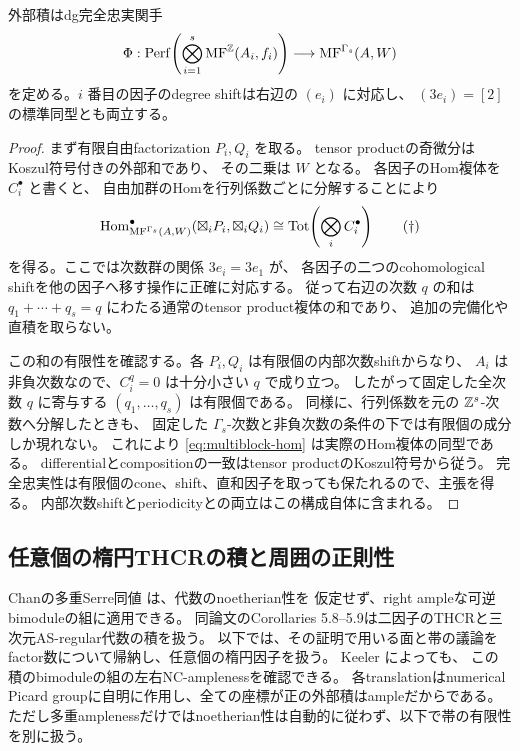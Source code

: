 \begin{lemma}[外部積の完全忠実性]\label{lem:multiblock-ff}
 外部積はdg完全忠実関手
 \[
 \Phi:\operatorname{Perf}\!\left(\bigotimes_{i=1}^s\operatorname{MF}^{\mathbb Z}(A_i,f_i)\right)
 \longrightarrow\operatorname{MF}^{\Gamma_s}(A,W)
 \]
 を定める。\(i\) 番目の因子のdegree shiftは右辺の \((e_i)\) に対応し、
 \((3e_i)=[2]\) の標準同型とも両立する。
\end{lemma}
\begin{proof}
 まず有限自由factorization \(P_i,Q_i\) を取る。
 tensor productの奇微分はKoszul符号付きの外部和であり、
 その二乗は \(W\) となる。
 各因子のHom複体を \(C_i^\bullet\) と書くと、
 自由加群のHomを行列係数ごとに分解することにより
 \[
 \operatorname{Hom}_{\operatorname{MF}^{\Gamma_s}(A,W)}^\bullet
       (\boxtimes_iP_i,\boxtimes_iQ_i)
 \cong
 \operatorname{Tot}\!\left(\bigotimes_i C_i^\bullet\right)
 \tag{\(\dagger\)}\label{eq:multiblock-hom}
 \]
 を得る。ここでは次数群の関係 \(3e_i=3e_1\) が、
 各因子の二つのcohomological shiftを他の因子へ移す操作に正確に対応する。
 従って右辺の次数 \(q\) の和は
 \(q_1+\cdots+q_s=q\) にわたる通常のtensor product複体の和であり、
 追加の完備化や直積を取らない。

 この和の有限性を確認する。各 \(P_i,Q_i\) は有限個の内部次数shiftからなり、
 \(A_i\) は非負次数なので、\(C_i^q=0\) は十分小さい \(q\) で成り立つ。
 したがって固定した全次数 \(q\) に寄与する \((q_1,\ldots,q_s)\) は有限個である。
 同様に、行列係数を元の \(\mathbb Z^s\)-次数へ分解したときも、
 固定した \(\Gamma_s\)-次数と非負次数の条件の下では有限個の成分しか現れない。
 これにより \eqref{eq:multiblock-hom} は実際のHom複体の同型である。
 differentialとcompositionの一致はtensor productのKoszul符号から従う。
 完全忠実性は有限個のcone、shift、直和因子を取っても保たれるので、主張を得る。
 内部次数shiftとperiodicityとの両立はこの構成自体に含まれる。
\end{proof}

\subsection{任意個の楕円THCRの積と周囲の正則性}

Chanの多重Serre同値 \cite[Theorem 3.4]{ChanMulti} は、代数のnoetherian性を
仮定せず、right ampleな可逆bimoduleの組に適用できる。
同論文のCorollaries 5.8--5.9は二因子のTHCRと三次元AS-regular代数の積を扱う。
以下では、その証明で用いる面と帯の議論をfactor数について帰納し、任意個の楕円因子を扱う。
Keeler \cite[Theorem 2.7, Corollary 2.8]{KeelerMulti} によっても、
この積のbimoduleの組の左右NC-amplenessを確認できる。
各translationはnumerical Picard groupに自明に作用し、全ての座標が正の外部積はampleだからである。
ただし多重amplenessだけではnoetherian性は自動的に従わず、以下で帯の有限性を別に扱う。

